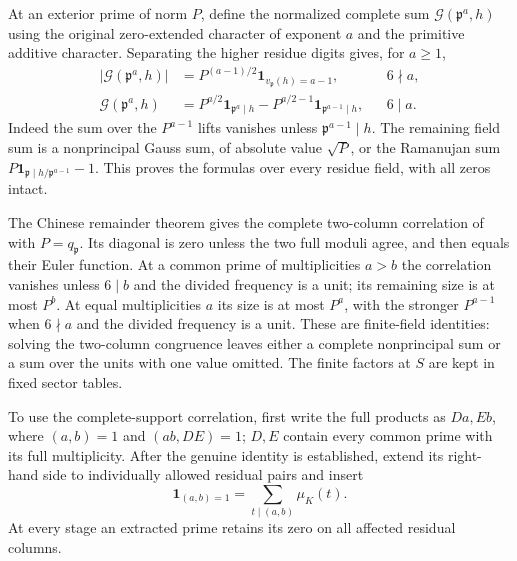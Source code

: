 \documentclass[11pt,a4paper]{article}
\numberwithin{equation}{section}
\theoremstyle{definition}
\theoremstyle{remark}
\begin{document}
At an exterior prime of norm $P$, define the normalized complete sum
$\mathcal G(\mathfrak p^a,h)$ using the original zero-extended
character of exponent $a$ and the primitive additive character.
Separating the higher residue digits gives, for $a\ge1$,
\begin{equation}\label{eq:can-local-G}
 \begin{aligned}
 |\mathcal G(\mathfrak p^a,h)|
   &=P^{(a-1)/2}\mathbf1_{v_{\mathfrak p}(h)=a-1},&&6\nmid a,\\
 \mathcal G(\mathfrak p^a,h)
   &=P^{a/2}\mathbf1_{\mathfrak p^a\mid h}
     -P^{a/2-1}\mathbf1_{\mathfrak p^{a-1}\mid h},&&6\mid a.
 \end{aligned}
\end{equation}
Indeed the sum over the $P^{a-1}$ lifts vanishes unless
$\mathfrak p^{a-1}\mid h$.  The remaining field sum is a nonprincipal
Gauss sum, of absolute value $\sqrt P$, or the Ramanujan sum
$P\mathbf1_{\mathfrak p\mid h/\mathfrak p^{a-1}}-1$.
This proves the formulas over every residue field, with all zeros intact.

The Chinese remainder theorem gives the complete two-column
correlation of \cite[Lemmas 13.3--13.4]{Q} with $P=q_{\mathfrak p}$.
Its diagonal is zero unless the two full moduli agree, and then equals
their Euler function.  At a common prime of multiplicities $a>b$ the
correlation vanishes unless $6\mid b$ and the divided frequency is a
unit; its remaining size is at most $P^b$.  At equal multiplicities
$a$ its size is at most $P^a$, with the stronger $P^{a-1}$ when
$6\nmid a$ and the divided frequency is a unit.  These are finite-field
identities: solving the two-column congruence leaves either a complete
nonprincipal sum or a sum over the units with one value omitted.
The finite factors at $S$ are kept in fixed sector tables.

To use the complete-support correlation, first write the full products
as $Da,Eb$, where $(a,b)=1$ and $(ab,DE)=1$; $D,E$ contain every
common prime with its full multiplicity.  After the genuine identity is
established, extend its right-hand side to individually allowed
residual pairs and insert
\begin{equation}\label{eq:can-full-mobius}
 \mathbf1_{(a,b)=1}=\sum_{t\mid(a,b)}\mu_K(t).
\end{equation}
  At every stage an extracted prime
retains its zero on all affected residual columns.
\end{document}

